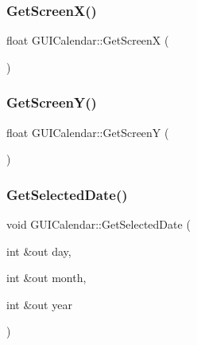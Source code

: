 \hypertarget{class_g_u_i_calendar_aa05f68718b7f3c0728c11722fdcfc8af}{}\label{class_g_u_i_calendar_aa05f68718b7f3c0728c11722fdcfc8af} 
\subsubsection{\texorpdfstring{Get\+Screen\+X()}{GetScreenX()}}
{\footnotesize\ttfamily float G\+U\+I\+Calendar\+::\+Get\+ScreenX (\begin{DoxyParamCaption}{ }\end{DoxyParamCaption})}

\hypertarget{class_g_u_i_calendar_a76fe79c1dbf5f778fd823d743ec2d496}{}\label{class_g_u_i_calendar_a76fe79c1dbf5f778fd823d743ec2d496} 
\subsubsection{\texorpdfstring{Get\+Screen\+Y()}{GetScreenY()}}
{\footnotesize\ttfamily float G\+U\+I\+Calendar\+::\+Get\+ScreenY (\begin{DoxyParamCaption}{ }\end{DoxyParamCaption})}

\hypertarget{class_g_u_i_calendar_a69a4736136a7b89360804cab5c208715}{}\label{class_g_u_i_calendar_a69a4736136a7b89360804cab5c208715} 
\subsubsection{\texorpdfstring{Get\+Selected\+Date()}{GetSelectedDate()}}
{\footnotesize\ttfamily void G\+U\+I\+Calendar\+::\+Get\+Selected\+Date (\begin{DoxyParamCaption}\item[{int \&out}]{day,  }\item[{int \&out}]{month,  }\item[{int \&out}]{year }\end{DoxyParamCaption})}

\hypertarget{class_g_u_i_calendar_aca1da814cb8b7bb1127e59122b2ccca1}{}\label{class_g_u_i_calendar_aca1da814cb8b7bb1127e59122b2ccca1} 
